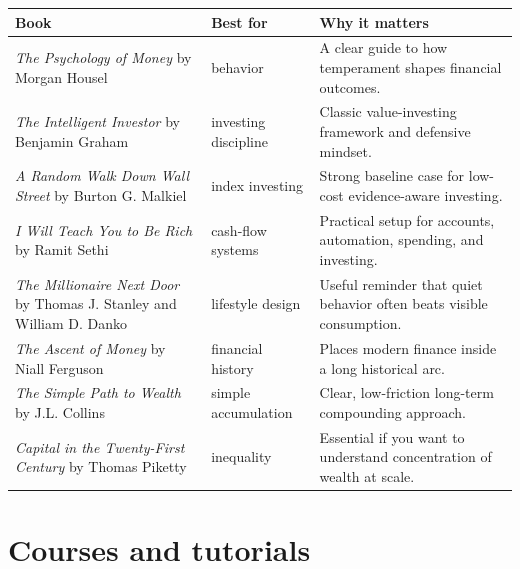 \documentclass[11pt,openany]{book}
\begin{document}
\begin{longtable}{>{\raggedright\arraybackslash}p{}p{}p{}}
\toprule
\textbf{Book} & \textbf{Best for} & \textbf{Why it matters} \\
\midrule
\endhead
\textit{The Psychology of Money} by Morgan Housel & behavior & A clear guide to how temperament shapes financial outcomes. \\
\textit{The Intelligent Investor} by Benjamin Graham & investing discipline & Classic value-investing framework and defensive mindset. \\
\textit{A Random Walk Down Wall Street} by Burton G. Malkiel & index investing & Strong baseline case for low-cost evidence-aware investing. \\
\textit{I Will Teach You to Be Rich} by Ramit Sethi & cash-flow systems & Practical setup for accounts, automation, spending, and investing. \\
\textit{The Millionaire Next Door} by Thomas J. Stanley and William D. Danko & lifestyle design & Useful reminder that quiet behavior often beats visible consumption. \\
\textit{The Ascent of Money} by Niall Ferguson & financial history & Places modern finance inside a long historical arc. \\
\textit{The Simple Path to Wealth} by J.L. Collins & simple accumulation & Clear, low-friction long-term compounding approach. \\
\textit{Capital in the Twenty-First Century} by Thomas Piketty & inequality & Essential if you want to understand concentration of wealth at scale. \\
\bottomrule
\end{longtable}

\section{Courses and tutorials}
\end{document}
